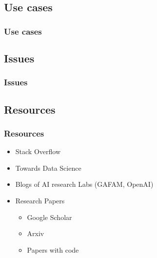 \subsection{Use cases}
\begin{frame}\frametitle{Use cases}

\end{frame}



\subsection{Issues}
\begin{frame}\frametitle{Issues}

\end{frame}



\subsection{Resources}
\begin{frame}\frametitle{Resources}

   \begin{itemize}
      \item Stack Overflow
      \item Towards Data Science
      \item Blogs of AI research Labs (GAFAM, OpenAI)
      \item Research Papers
      \begin{itemize}
         \item Google Scholar
         \item Arxiv
         \item Papers with code
      \end{itemize}
   \end{itemize}

\end{frame}



